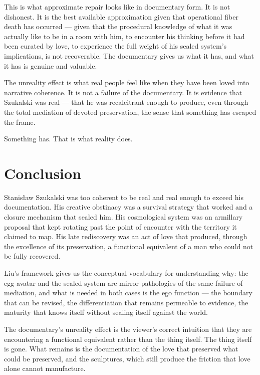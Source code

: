 \documentclass[11pt, a4paper]{article}
\theoremstyle{named}
\begin{document}
This is what approximate repair looks like in documentary form. It
is not dishonest. It is the best available approximation given that
operational fiber death has occurred — given that the procedural
knowledge of what it was actually like to be in a room with him, to
encounter his thinking before it had been curated by love, to
experience the full weight of his sealed system's implications, is
not recoverable. The documentary gives us what it has, and what it
has is genuine and valuable.

The unreality effect is what real people feel like when they have been
loved into narrative coherence. It is not a failure of the documentary.
It is evidence that Szukalski was real — that he was recalcitrant
enough to produce, even through the total mediation of devoted
preservation, the sense that something has escaped the frame.

Something has. That is what reality does.

\section*{Conclusion}

Stanis\l{}aw Szukalski was too coherent to be real and real enough to
exceed his documentation. His creative obstinacy was a survival
strategy that worked and a closure mechanism that sealed him. His
cosmological system was an armillary proposal that kept rotating past
the point of encounter with the territory it claimed to map. His
late rediscovery was an act of love that produced, through the
excellence of its preservation, a functional equivalent of a man
who could not be fully recovered.

Liu's framework gives us the conceptual vocabulary for understanding
why: the egg avatar and the sealed system are mirror pathologies of
the same failure of mediation, and what is needed in both cases is
the ego function — the boundary that can be revised, the
differentiation that remains permeable to evidence, the maturity
that knows itself without sealing itself against the world.

The documentary's unreality effect is the viewer's correct intuition
that they are encountering a functional equivalent rather than the
thing itself. The thing itself is gone. What remains is the
documentation of the love that preserved what could be preserved,
and the sculptures, which still produce the friction that love alone
cannot manufacture.
\end{document}
